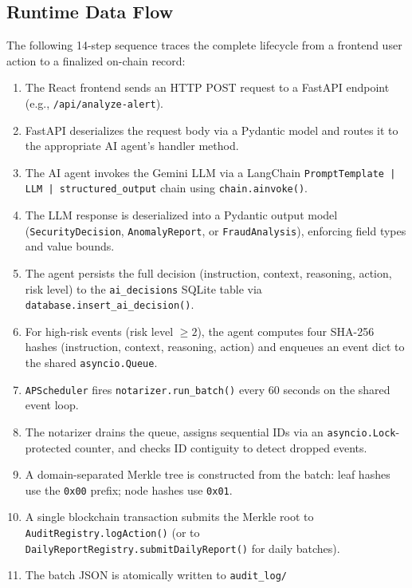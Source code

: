 \documentclass[12pt,a4paper]{article}
\begin{document}
\subsection{Runtime Data Flow}
\label{sec:dataflow}

The following 14-step sequence traces the complete lifecycle from a
frontend user action to a finalized on-chain record:

\begin{enumerate}
  \item The React frontend sends an HTTP POST request to a FastAPI
        endpoint (e.g., \texttt{/api/analyze-alert}).
  \item FastAPI deserializes the request body via a Pydantic model and
        routes it to the appropriate AI agent's handler method.
  \item The AI agent invokes the Gemini LLM via a LangChain
        \texttt{PromptTemplate | LLM | structured\_output} chain
        using \texttt{chain.ainvoke()}.
  \item The LLM response is deserialized into a Pydantic output model
        (\texttt{SecurityDecision}, \texttt{AnomalyReport}, or
        \texttt{FraudAnalysis}), enforcing field types and value bounds.
  \item The agent persists the full decision (instruction, context,
        reasoning, action, risk level) to the \texttt{ai\_decisions}
        SQLite table via \texttt{database.insert\_ai\_decision()}.
  \item For high-risk events (risk level $\geq 2$), the agent computes
        four SHA-256 hashes (instruction, context, reasoning, action)
        and enqueues an event dict to the shared \texttt{asyncio.Queue}.
  \item \texttt{APScheduler} fires \texttt{notarizer.run\_batch()} every
        60 seconds on the shared event loop.
  \item The notarizer drains the queue, assigns sequential IDs via an
        \texttt{asyncio.Lock}-protected counter, and checks ID contiguity
        to detect dropped events.
  \item A domain-separated Merkle tree is constructed from the batch:
        leaf hashes use the \texttt{0x00} prefix; node hashes use \texttt{0x01}.
  \item A single blockchain transaction submits the Merkle root to
        \texttt{AuditRegistry.logAction()} (or to
        \texttt{DailyReportRegistry.submitDailyReport()} for daily batches).
  \item The batch JSON is atomically written to \texttt{audit\_log/}

\end{enumerate}
\end{document}
